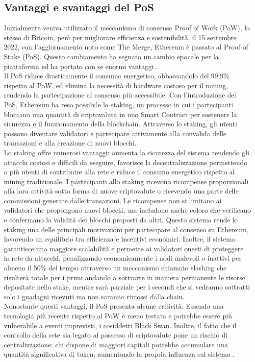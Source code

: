 \subsection{Vantaggi e svantaggi del PoS}
Inizialmente veniva utilizzato il meccanismo di consenso Proof of Work (PoW), lo stesso di Bitcoin, però per migliorare efficienza e sostenibilità, il 15 settembre 2022, con l’aggiornamento noto come The Merge, Ethereum è passato al Proof of Stake (PoS). 
Questo cambiamento ha segnato un cambio epocale per la piattaforma ed ha portato con se enormi vantaggi \cite{crypto_gateway_video}.
\\Il PoS riduce drasticamente il consumo energetico, abbassandolo del 99,9\% rispetto al PoW, ed elimina la necessità di hardware costoso per il mining, rendendo la partecipazione al consenso più accessibile.
Con l’introduzione del PoS, Ethereum ha reso possibile lo staking, un processo in cui i partecipanti bloccano una quantità di criptovaluta in uno Smart Contract per sostenere la sicurezza e il funzionamento della blockchain. Attraverso lo staking, gli utenti possono diventare validatori e partecipare attivamente alla convalida delle transazioni e alla creazione di nuovi blocchi.
\\Lo staking offre numerosi vantaggi: aumenta la sicurezza del sistema rendendo gli attacchi costosi e difficili da eseguire, favorisce la decentralizzazione permettendo a più utenti di contribuire alla rete e riduce il consumo energetico rispetto al mining tradizionale. 
I partecipanti allo staking ricevono ricompense proporzionali alla loro attività sotto forma di nuove criptovalute o ricevendo una parte delle commissioni generate dalle transazioni.
Le ricompense non si limitano ai validatori che propongono nuovi blocchi, ma includono anche coloro che verificano e confermano la validità dei blocchi proposti da altri. Questo sistema rende lo staking una delle principali motivazioni per partecipare al consenso su Ethereum, favorendo un equilibrio tra efficienza e incentivi economici.
Inoltre, il sistema garantisce una maggiore scalabilità e permette ai validatori onesti di proteggere la rete da attacchi, penalizzando economicamente i nodi malevoli o inattivi per almeno il 50\% del tempo attraverso un meccanismo chiamato slashing che risulterà totale per i primi andando a sottrarre in maniera permanente le risorse depositate nello stake, mentre sarà parziale per i secondi che si vedranno sottratti solo i guadagni ricevuti ma non saranno rimossi dalla chain.
\\Nonostante questi vantaggi, il PoS presenta alcune criticità. Essendo una tecnologia più recente rispetto al PoW è meno testata e potrebbe essere più vulnerabile a eventi imprevisti, i cosiddetti Black Swan. Inoltre, il fatto che il controllo della rete sia legato al possesso di criptovalute pone un rischio di centralizzazione: chi dispone di maggiori capitali potrebbe accumulare una quantità significativa di token, aumentando la propria influenza sul sistema \cite{kraken_docsend}.
